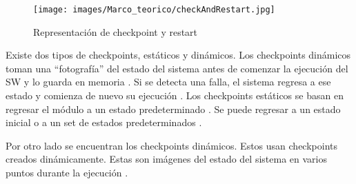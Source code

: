 \begin{comment}
\begin{figure}[h]
  \centering
  \begin{tikzpicture}
  \tikzstyle{cuadro} = [draw, sep=5,rectangle,minimum height=3em, minimum width=6em, node 
  distance=2cm] 

  \tikzstyle{vacio} = [inner, sep=5,rectangle,minimum height=3em, minimum width=6em, node 
  distance=3cm] 

  \tikzstyle{circulo} = [fill, shape=circle, minimum size=5pt, inner sep=3pt, node distance=4cm ]
  
  \node[cuadro] (checkMemo){Memoria de Checkpoint};
  \node[cuadro , below of=checkMemo, pin={[->] left:Entrada}] (modulo){Módulo en ejecución};
  \node[circulo, right of=modulo] (circ){};
  \node[cuadro, below of=circ] (detector){Test de aceptación};
  \node[vacio, right of = circ] (salida){Salida};

  \draw[->] (checkMemo.-30)--(modulo.30);
  \draw[->] (modulo.150) -- (checkMemo.-150);
  \draw[->] (modulo)--(circ);
  \draw[->] (circ)--(salida);
  \draw[->] (circ)--(detector);
  \draw[->] (detector)-|(modulo) node[near end, left] {retry};
  \end{tikzpicture}
  \caption{Representación de checkpoint y restart}
  \label{fig:checkAndRestart}
\end{figure}
\end{comment}

\begin{figure}[h]
 \centering
 \texttt{[image: images/Marco\_teorico/checkAndRestart.jpg]}
 \caption{Representación de checkpoint y restart}
 \label{fig:checkAndRestart}
\end{figure} 


Existe dos tipos de checkpoints, estáticos y dinámicos. Los checkpoints dinámicos toman una 
``fotografía'' del estado del sistema antes de comenzar la ejecución del \ac{SW} y lo guarda en 
memoria \citep{FTDesign}. Si se detecta una falla, el sistema regresa a ese estado y 
comienza de nuevo su ejecución \citep{FTDesign}. Los checkpoints estáticos se basan en regresar el 
módulo a un estado predeterminado \citep{SoftwareFaultToleranceATutorial}. Se puede regresar a un 
estado inicial o a un set de estados predeterminados \citep{SoftwareFaultToleranceATutorial}.

Por otro lado se encuentran los checkpoints dinámicos. Estos usan checkpoints creados 
dinámicamente. Estas son imágenes del estado del sistema en varios puntos durante la ejecución 
\citep{SoftwareFaultToleranceATutorial}.

